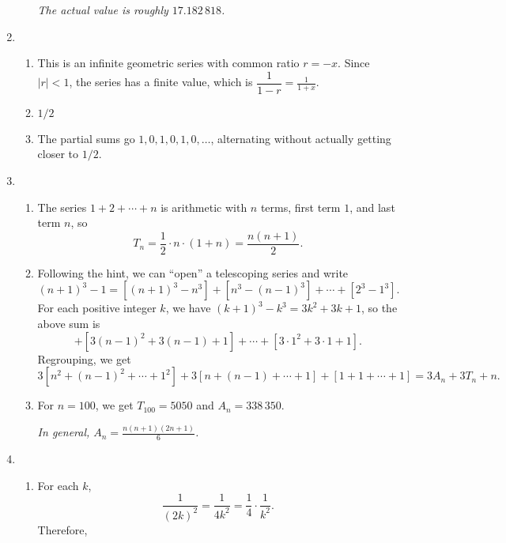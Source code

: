 \begin{enumerate}
\begin{enumerate}
\emph{The actual value is roughly $17.182\,818$.}
\end{enumerate}
\item \begin{enumerate}
\item This is an infinite geometric series with common ratio $r = -x$. Since $\lvert r\vert < 1$, the series has a finite value, which is $\dfrac{1}{1 - r} = \boxed{\frac{1}{1 + x}}$.
\item $1/2$
\item The partial sums go $1, 0, 1, 0, 1, 0, \ldots$, alternating without actually getting closer to $1/2$.
\end{enumerate}
\item \begin{enumerate}
\item The series $1 + 2 + \cdots + n$ is arithmetic with $n$ terms, first term $1$, and last term $n$, so
\begin{equation*}
T_n = \frac{1}{2}\cdot n\cdot (1 + n) = \frac{n(n + 1)}{2}.
\end{equation*}
\item Following the hint, we can ``open'' a telescoping series and write
\begin{equation*} 
(n + 1)^3 - 1 = [(n + 1)^3 - n^3] + [n^3 - (n - 1)^3] + \cdots + [2^3 - 1^3].
\end{equation*}
For each positive integer $k$, we have $(k + 1)^3 - k^3 = 3k^2 + 3k + 1$, so the above sum is
\begin{equation*}
[3n^2 + 3n + 1] + [3(n - 1)^2 + 3(n - 1) + 1] + \cdots + [3\cdot 1^2 + 3\cdot 1 + 1].
\end{equation*}
Regrouping, we get
\begin{equation*}
3[n^2 + (n - 1)^2 + \cdots + 1^2] + 3[n + (n - 1) + \cdots + 1] + [1 + 1 + \cdots + 1] = 3A_n + 3T_n + n.
\end{equation*}
\item For $n = 100$, we get $T_{100} = 5050$ and $A_n = 338\,350$.\par
\emph{In general, $A_n = \frac{n(n + 1)(2n + 1)}{6}$.}
\end{enumerate}
\item \begin{enumerate}
\item For each $k$,
\begin{equation*}
\frac{1}{(2k)^2} = \frac{1}{4k^2} = \frac{1}{4}\cdot\frac{1}{k^2}.
\end{equation*}
Therefore,
\begin{equation*}

\end{equation*}
\end{enumerate}
\end{enumerate}
